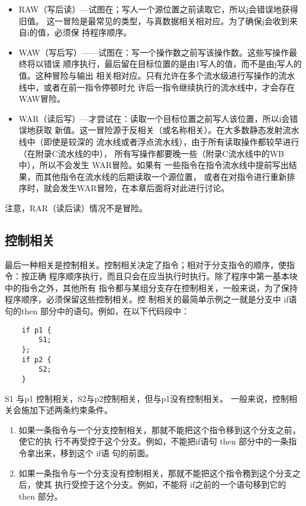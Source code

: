 \begin{itemize}
    \item RAW（写后读）—试图在；写人一个源位置之前读取它，所以j会错误地获得旧值。
    这一冒险是最常见的类型，与真数据相关相对应。为了确保j会收到来自i的值，必须保
    持程序顺序。
    
    \item WAW（写后写）——试图在：写一个操作数之前写该操作数。这些写操作最终将以错误
    顺序执行，最后留在目标位置的是由1写人的值，而不是由j写人的值。这种冒险与输出
    相关相对应。只有允许在多个流水级进行写操作的流水线中，或者在前一指令停顿时允
    许后一指令继续执行的流水线中，才会存在WAW冒险。
    
    \item WAR（读后写）—才尝试在：读取一个目标位置之前写人该位置，所以i会错误地获取
    新值。这一冒险源于反相关（或名称相关）。在大多数静态发射流水线中（即使是较深的
    流水线或者浮点流水线），由于所有读取操作都较早进行（在附录C流水线的中），
    所有写操作都要晚一些（附录C流水线中的WB中），所以不会发生 WAR冒险。如果有
    一些指令在指令流水线中提前写出结果，而其他指令在流水线的后期读取一个源位置，
    或者在对指令进行重新排序时，就会发生WAR冒险，在本章后面将对此进行讨论。
\end{itemize}

注意，RAR（读后读）情况不是冒险。

\subsection{控制相关}
最后一种相关是控制相关。控制相关决定了指令；相对于分支指令的顺序，使指令：按正确
程序顺序执行，而且只会在应当执行时执行。除了程序中第一基本块中的指令之外，其他所有
指令都与某组分支存在控制相关，一般来说，为了保持程序顺序，必须保留这些控制相关。控
制相关的最简单示例之一就是分支中 if语句的then 部分中的语句。例如，在以下代码段中：
\begin{verbatim}
    if p1 {
        S1;
    };
    if p2 {
        S2;
    }
\end{verbatim}
S1 与p1 控制相关，S2与p2控制相关，但与p1没有控制相关。
一般来说，控制相关会施加下述两条约束条件。

\begin{enumerate}
    \item 如果一条指令与一个分支控制相关，那就不能把这个指令移到这个分支之前，使它的执
    行不再受控于这个分支。例如，不能把if语句 then 部分中的一条指令拿出来，移到这个 if语
    句的前面。
    \item 如果一条指令与一个分支没有控制相关，那就不能把这个指令務到这个分支之后，使其
    执行受控于这个分支。例如，不能将 if之前的一个语句移到它的 then 部分。
\end{enumerate}


